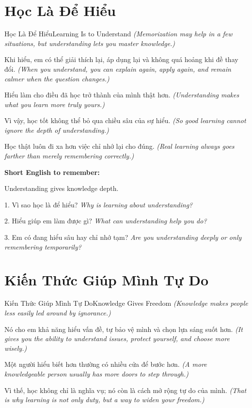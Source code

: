 \section{Học Là Để Hiểu}
\begin{truyen}{Học Là Để Hiểu}{Learning Is to Understand}
\textit{(Memorization may help in a few situations, but understanding lets you master knowledge.)}

Khi hiểu, em có thể giải thích lại, áp dụng lại và không quá hoảng khi đề thay đổi.
\textit{(When you understand, you can explain again, apply again, and remain calmer when the question changes.)}

Hiểu làm cho điều đã học trở thành của mình thật hơn.
\textit{(Understanding makes what you learn more truly yours.)}

Vì vậy, học tốt không thể bỏ qua chiều sâu của sự hiểu.
\textit{(So good learning cannot ignore the depth of understanding.)}
\end{truyen}

\begin{baihoc}
Học thật luôn đi xa hơn việc chỉ nhớ lại cho đúng.
\textit{(Real learning always goes farther than merely remembering correctly.)}
\end{baihoc}

\begin{ghinhoanh}
\textbf{Short English to remember:}

Understanding gives knowledge depth.

\end{ghinhoanh}

\begin{tuhocnhanh}
1. Vì sao học là để hiểu? \textit{Why is learning about understanding?}

2. Hiểu giúp em làm được gì? \textit{What can understanding help you do?}

3. Em có đang hiểu sâu hay chỉ nhớ tạm? \textit{Are you understanding deeply or only remembering temporarily?}
\end{tuhocnhanh}
\ngancach

\section{Kiến Thức Giúp Mình Tự Do}
\begin{truyen}{Kiến Thức Giúp Mình Tự Do}{Knowledge Gives Freedom}
\textit{(Knowledge makes people less easily led around by ignorance.)}

Nó cho em khả năng hiểu vấn đề, tự bảo vệ mình và chọn lựa sáng suốt hơn.
\textit{(It gives you the ability to understand issues, protect yourself, and choose more wisely.)}

Một người hiểu biết hơn thường có nhiều cửa để bước hơn.
\textit{(A more knowledgeable person usually has more doors to step through.)}

Vì thế, học không chỉ là nghĩa vụ; nó còn là cách mở rộng tự do của mình.
\textit{(That is why learning is not only duty, but a way to widen your freedom.)}
\end{truyen}

